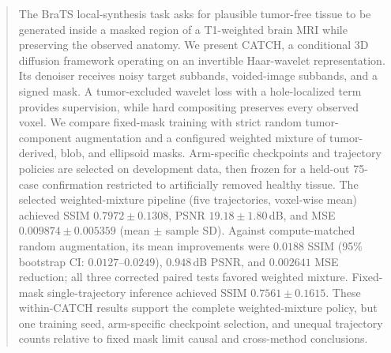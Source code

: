 \begin{abstract}
The BraTS local-synthesis task asks for plausible tumor-free tissue to be generated
inside a masked region of a T1-weighted brain MRI while preserving the observed
anatomy. We present CATCH, a conditional 3D diffusion framework operating on an
invertible Haar-wavelet representation. Its denoiser receives noisy target
subbands, voided-image subbands, and a signed mask. A tumor-excluded wavelet loss
with a hole-localized term provides supervision, while hard compositing preserves
every observed voxel. We compare fixed-mask training with strict random
tumor-component augmentation and a configured weighted mixture of tumor-derived,
blob, and ellipsoid masks. Arm-specific checkpoints and trajectory policies are
selected on development data, then frozen for a held-out 75-case confirmation
restricted to artificially removed healthy tissue. The selected weighted-mixture
pipeline (five trajectories, voxel-wise mean) achieved SSIM
$0.7972\pm0.1308$, PSNR $19.18\pm1.80$\,dB, and MSE
$0.009874\pm0.005359$ (mean $\pm$ sample SD). Against compute-matched random
augmentation, its mean improvements were $0.0188$ SSIM (95\% bootstrap CI:
$0.0127$--$0.0249$), $0.948$\,dB PSNR, and $0.002641$ MSE reduction; all three
corrected paired tests favored weighted mixture. Fixed-mask single-trajectory
inference achieved SSIM $0.7561\pm0.1615$. These within-CATCH results support the
complete weighted-mixture policy, but one training seed, arm-specific checkpoint
selection, and unequal trajectory counts relative to fixed mask limit causal and
cross-method conclusions.

\end{abstract}
